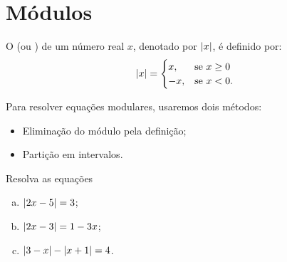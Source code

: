 \section{Módulos}

\begin{definition}
O  (ou ) de um número real $x$,
denotado por $\left|x\right|$, é definido por:
%
\begin{align*}
\left|x\right| =
\begin{cases}
x , & \text{se $x \ge 0$} \\
-x, & \text{se $x<0$}.
\end{cases}
\end{align*}
\end{definition}

\noindent Para resolver equações modulares, usaremos dois métodos:
%
\begin{itemize}
  \item Eliminação do módulo pela definição;
  \item Partição em intervalos.
\end{itemize}

\begin{example}
Resolva as equações
\begin{enumerate}[(a)]
  \item $\left|2x-5\right| = 3$;
  \item $\left|2x-3\right| = 1-3x$;
  \item $\left|3-x\right| - \left|x+1\right| = 4$.
\end{enumerate}
\end{example}

